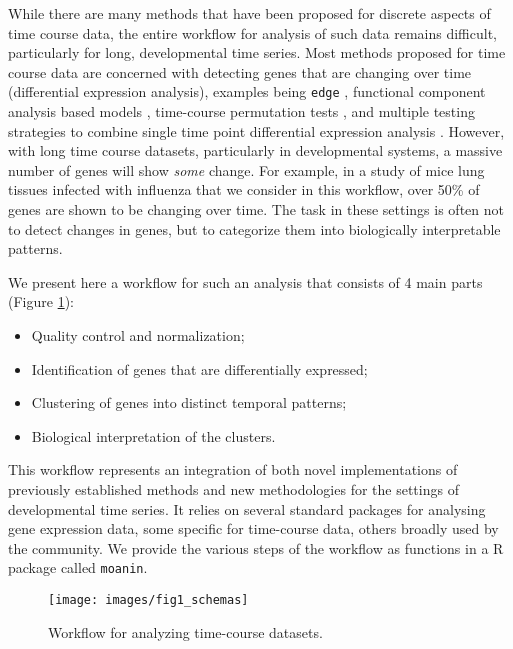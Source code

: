 \documentclass[9pt,a4paper,]{extarticle}
\begin{document}
While there are many methods that have been proposed for discrete aspects of
time course data, the entire workflow for analysis of such data remains
difficult, particularly for long, developmental time series. Most methods
proposed for time course data are concerned with detecting genes that are
changing over time (differential expression analysis), examples being \texttt{edge}
\citep{storey:significance}, functional component analysis based models \citep{wu:more},
time-course permutation tests \citep{park:statistical}, and multiple testing
strategies to combine single time point differential expression analysis
\citep{sun:multiple}. However, with long time course datasets, particularly in
developmental systems, a massive number of genes will show \emph{some} change. For
example, in a study of mice lung tissues infected with influenza that we consider in this workflow, over 50\% of genes
are shown to be changing over time. The task in these settings is often not to
detect changes in genes, but to categorize them into biologically interpretable
patterns.

We present here a workflow for such an analysis that consists of 4 main
parts (Figure \ref{fig:schema}):

\begin{itemize}
\tightlist
\item
  Quality control and normalization;
\item
  Identification of genes that are differentially expressed;
\item
  Clustering of genes into distinct temporal patterns;
\item
  Biological interpretation of the clusters.
\end{itemize}

This workflow represents an integration of both novel implementations of
previously established methods and new methodologies for the settings of
developmental time series. It relies on several standard packages for
analysing gene expression data, some specific for time-course data, others
broadly used by the community. We provide the various steps of the workflow as
functions in a R package called \texttt{moanin}.

\begin{figure}

{\centering \texttt{[image: images/fig1\_schemas]} 

}

\caption{Workflow for analyzing time-course datasets.}\label{fig:schema}
\end{figure}
\end{document}

